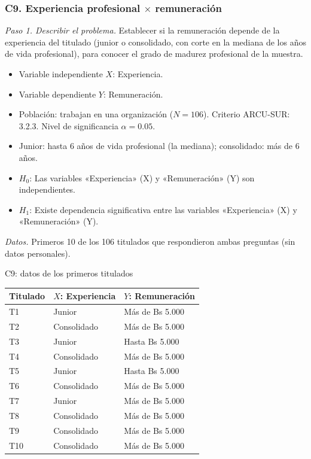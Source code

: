 \subsubsection*{C9. Experiencia profesional $\times$ remuneración}

\textit{Paso 1. Describir el problema.} Establecer si la remuneración depende de la experiencia del titulado (junior o consolidado, con corte en la mediana de los años de vida profesional), para conocer el grado de madurez profesional de la muestra.

\begin{itemize}[nosep]
  \item Variable independiente $X$: Experiencia.
  \item Variable dependiente $Y$: Remuneración.
  \item Población: trabajan en una organización ($N = 106$). Criterio ARCU-SUR: 3.2.3. Nivel de significancia $\alpha = 0.05$.
  \item Junior: hasta 6 años de vida profesional (la mediana); consolidado: más de 6 años.
  \item $H_0$: Las variables «Experiencia» (X) y «Remuneración» (Y) son independientes.
  \item $H_1$: Existe dependencia significativa entre las variables «Experiencia» (X) y «Remuneración» (Y).
\end{itemize}

\textit{Datos.} Primeros 10 de los 106 titulados que respondieron ambas preguntas (sin datos personales).

\begin{mitabla}{C9: datos de los primeros titulados}
\begin{tabular}{lll}
\toprule
Titulado & $X$: Experiencia & $Y$: Remuneración \\
\midrule
T1 & Junior & Más de Bs 5.000 \\
T2 & Consolidado & Más de Bs 5.000 \\
T3 & Junior & Hasta Bs 5.000 \\
T4 & Consolidado & Más de Bs 5.000 \\
T5 & Junior & Hasta Bs 5.000 \\
T6 & Consolidado & Más de Bs 5.000 \\
T7 & Junior & Más de Bs 5.000 \\
T8 & Consolidado & Más de Bs 5.000 \\
T9 & Consolidado & Más de Bs 5.000 \\
T10 & Consolidado & Más de Bs 5.000 \\
\bottomrule
\end{tabular}
\end{mitabla}

